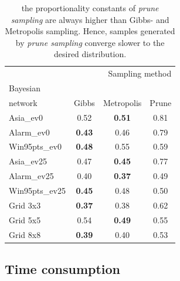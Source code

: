 \documentclass[a4paper, twoside, 11pt]{report}
\theoremstyle{plain}
\theoremstyle{definition}
\theoremstyle{remark}
\newcommand{\ps}{\textit{prune sampling }}
\begin{document}
\begin{center}
\begin{table}[H]
\begin{center}
\begin{tabular}{l c c c}  
\toprule
\multicolumn{4}{r}{Sampling method} \\
\cmidrule(r){2-4}
Bayesian \\ network    & Gibbs    & Metropolis & Prune  \\
\midrule
Asia\_ev0 & 0.52 & \textbf{0.51} & 0.81  \\
Alarm\_ev0 & \textbf{0.43} & 0.46 & 0.79  \\
Win95pts\_ev0 & \textbf{0.48} & 0.55 & 0.59  \\
Asia\_ev25 & 0.47 & \textbf{0.45} & 0.77  \\
Alarm\_ev25 & 0.40 & \textbf{0.37} & 0.49  \\
Win95pts\_ev25 & \textbf{0.45} & 0.48 & 0.50  \\
Grid 3x3 & \textbf{0.37} & 0.38 & 0.62  \\
Grid 5x5 & 0.54 & \textbf{0.49} & 0.55  \\
Grid 8x8 & \textbf{0.39} & 0.40 & 0.53  \\
\bottomrule
\end{tabular}
\caption{the proportionality constants of \ps are always higher than Gibbs- and Metropolis sampling. Hence, samples generated by \ps converge slower to the desired distribution.}
\label{ROC-table}
\end{center}
\end{table}
\end{center}

\subsection{Time consumption}
\end{document}
